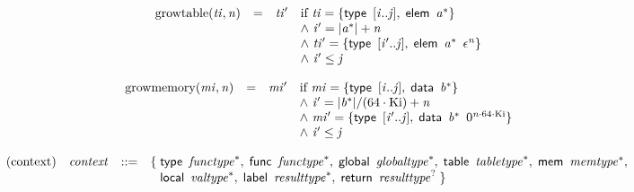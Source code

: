 \vspace{1ex}

$$
\begin{array}{@{}lcl@{}l@{}}
{\mathrm{growtable}}({\mathit{ti}}, {\mathit{n}}) &=& {\mathit{ti}'} &\quad
  \mbox{if}~{\mathit{ti}} = \{ \begin{array}[t]{@{}l@{}}
\mathsf{type}~\,{}[{\mathit{i}} .. {\mathit{j}}],\; \mathsf{elem}~\,{{\mathit{a}}^\ast} \}\end{array} \\
 &&&\quad {\land}~{\mathit{i}'} = {|{{\mathit{a}}^\ast}|} + {\mathit{n}} \\
 &&&\quad {\land}~{\mathit{ti}'} = \{ \begin{array}[t]{@{}l@{}}
\mathsf{type}~\,{}[{\mathit{i}'} .. {\mathit{j}}],\; \mathsf{elem}~\,{{\mathit{a}}^\ast}~\,{\epsilon^{{\mathit{n}}}} \}\end{array} \\
 &&&\quad {\land}~{\mathit{i}'} \leq {\mathit{j}} \\
\end{array}
$$

$$
\begin{array}{@{}lcl@{}l@{}}
{\mathrm{growmemory}}({\mathit{mi}}, {\mathit{n}}) &=& {\mathit{mi}'} &\quad
  \mbox{if}~{\mathit{mi}} = \{ \begin{array}[t]{@{}l@{}}
\mathsf{type}~\,{}[{\mathit{i}} .. {\mathit{j}}],\; \mathsf{data}~\,{{\mathit{b}}^\ast} \}\end{array} \\
 &&&\quad {\land}~{\mathit{i}'} = {|{{\mathit{b}}^\ast}|} / (64 \cdot {\mathrm{Ki}}) + {\mathit{n}} \\
 &&&\quad {\land}~{\mathit{mi}'} = \{ \begin{array}[t]{@{}l@{}}
\mathsf{type}~\,{}[{\mathit{i}'} .. {\mathit{j}}],\; \mathsf{data}~\,{{\mathit{b}}^\ast}~\,{0^{{\mathit{n}} \cdot 64 \cdot {\mathrm{Ki}}}} \}\end{array} \\
 &&&\quad {\land}~{\mathit{i}'} \leq {\mathit{j}} \\
\end{array}
$$

$$
\begin{array}{@{}lrrl@{}l@{}}
\mbox{(context)} & {\mathit{context}} &::=& \{\; \begin{array}[t]{@{}l@{}l@{}}
\mathsf{type}~\,{{\mathit{functype}}^\ast},\; \mathsf{func}~\,{{\mathit{functype}}^\ast},\; \mathsf{global}~\,{{\mathit{globaltype}}^\ast},\; \mathsf{table}~\,{{\mathit{tabletype}}^\ast},\; \mathsf{mem}~\,{{\mathit{memtype}}^\ast},\; \\
  \mathsf{local}~\,{{\mathit{valtype}}^\ast},\; \mathsf{label}~\,{{\mathit{resulttype}}^\ast},\; \mathsf{return}~\,{{\mathit{resulttype}}^?} \;\}\end{array} \\
\end{array}
$$


